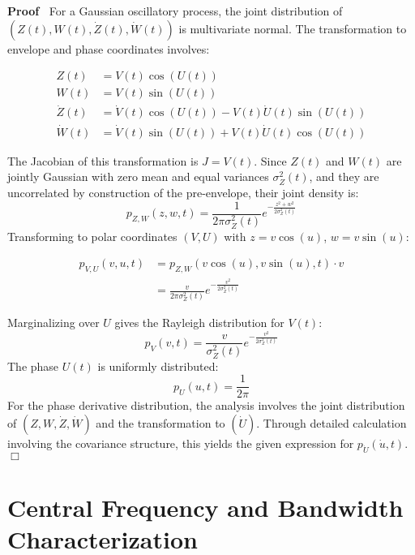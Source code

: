 \documentclass{article}
\newenvironment{proof}{\noindent\textbf{Proof\ }}{\hspace*{\fill}$\Box$\medskip}
\begin{document}
\begin{proof}
  For a Gaussian oscillatory process, the joint distribution of $(Z (t), W
  (t), \dot{Z} (t), \dot{W} (t))$ is multivariate normal. The transformation
  to envelope and phase coordinates involves:
  
  \begin{align}
    Z (t) & = V (t) \cos (U (t)) \\
    W (t) & = V (t) \sin (U (t)) \\
    \dot{Z} (t) & = \dot{V} (t) \cos (U (t)) - V (t) \dot{U} (t) \sin (U (t))
    \\
    \dot{W} (t) & = \dot{V} (t) \sin (U (t)) + V (t) \dot{U} (t) \cos (U (t)) 
  \end{align}
  
  The Jacobian of this transformation is $J = V (t)$. Since $Z (t)$ and $W
  (t)$ are jointly Gaussian with zero mean and equal variances $\sigma_Z^2
  (t)$, and they are uncorrelated by construction of the pre-envelope, their
  joint density is:
  \begin{equation}
    p_{Z, W} (z, w, t) = \frac{1}{2 \pi \sigma_Z^2 (t)} e^{- \frac{z^2 +
    w^2}{2 \sigma_Z^2 (t)}}
  \end{equation}
  Transforming to polar coordinates $(V, U)$ with $z = v \cos (u)$, $w = v
  \sin (u)$:
  
  \begin{align}
    p_{V, U} (v, u, t) & = p_{Z, W} (v \cos (u), v \sin (u), t) \cdot v \\
    & = \frac{v}{2 \pi \sigma_Z^2 (t)} e^{- \frac{v^2}{2 \sigma_Z^2 (t)}} 
  \end{align}
  
  Marginalizing over $U$ gives the Rayleigh distribution for $V (t)$:
  \begin{equation}
    p_V (v, t) = \frac{v}{\sigma_Z^2 (t)} e^{- \frac{v^2}{2 \sigma_Z^2 (t)}}
  \end{equation}
  The phase $U (t)$ is uniformly distributed:
  \begin{equation}
    p_U (u, t) = \frac{1}{2 \pi}
  \end{equation}
  For the phase derivative distribution, the analysis involves the joint
  distribution of $(Z, W, \dot{Z}, \dot{W})$ and the transformation to
  $(\dot{U})$. Through detailed calculation involving the covariance
  structure, this yields the given expression for $p_{\dot{U}} (\dot{u}, t)$.
\end{proof}

\section{Central Frequency and Bandwidth Characterization}
\end{document}

